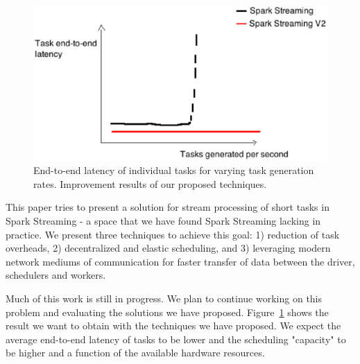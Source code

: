 \noindent

\begin{figure}[t!]
  \begin{center}
\includegraphics[scale=0.4]{money_graph.eps}
  \end{center}
  \caption{End-to-end latency of individual tasks for varying task generation rates. Improvement results of our proposed techniques.}
  \label{fig:money_graph}
\end{figure}

This paper tries to present a solution for stream processing of short tasks in Spark Streaming - a space that we have found Spark Streaming lacking in practice.
We present three techniques to achieve this goal: 1) reduction of task overheads, 2) decentralized and elastic scheduling, and 3) leveraging modern network mediums of communication for faster transfer of data between the driver, schedulers and workers.

Much of this work is still in progress. We plan to continue working on this problem and evaluating the solutions we have proposed. Figure~\ref{fig:money_graph} shows the result we want to obtain with the techniques we have proposed. We expect the average end-to-end latency of tasks to be lower and the scheduling "capacity" to be higher and a function of the available hardware resources.
